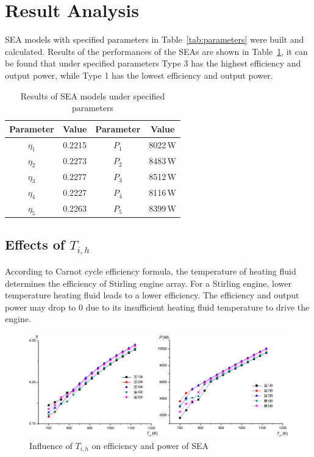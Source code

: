 \section{Result Analysis}

SEA models with specified parameters in Table~\ref{tab:parameters} were built and calculated. Results of the performances of the SEAs are shown in Table~\ref{tab:result}, it can be found that under specified parameters Type 3 has the highest efficiency and output power, while Type 1 has the lowest efficiency and output power.

\begin{table}[htbp]
	\caption{Results of SEA models under specified parameters}
	\begin{center}
	\begin{tabular}{cccc}
		\toprule
		Parameter		&	Value	&	Parameter		&	Value\\
		\midrule
		$\eta_1$	&	0.2215	&	$P_1$		&	8022\,W\\
		$\eta_2$	&	0.2273	&	$P_2$		&	8483\,W\\
		$\eta_3$	&	0.2277	&	$P_3$		&	8512\,W\\
		$\eta_4$	&	0.2227	&	$P_4$		&	8116\,W\\
		$\eta_5$	&	0.2263	&	$P_5$		&	8399\,W\\		
		\bottomrule
	\end{tabular}
	\end{center}
	\label{tab:result}
\end{table}

\subsection{Effects of $T_{i,h}$}
According to Carnot cycle efficiency formula, the temperature of heating fluid determines the efficiency of Stirling engine array. For a Stirling engine, lower temperature heating fluid leads to a lower efficiency. The efficiency and output power may drop to 0 due to its insufficient heating fluid temperature to drive the engine.

\noindent \begin{figure}[htbp]
\begin{center}
	\includegraphics[width = 0.7\columnwidth]{fig/T_ih}
	\caption{Influence of $T_{i,h}$ on efficiency and power of SEA}
	\label{fig:Ti_h}
\end{center}
\end{figure}

